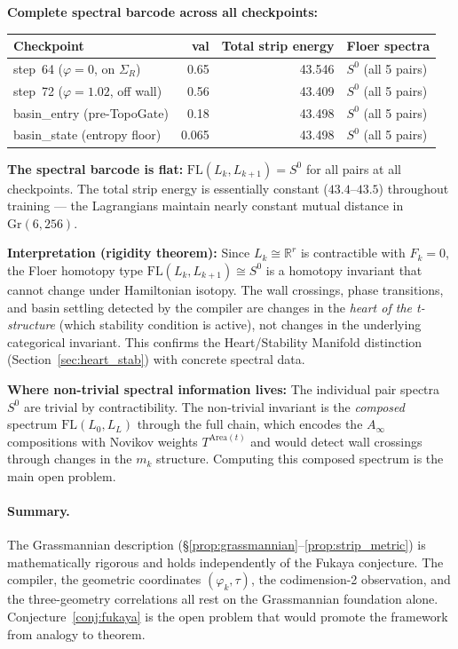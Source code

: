 \documentclass[11pt]{amsart}
\begin{document}
\textbf{Complete spectral barcode across all checkpoints:}

\begin{center}\small
\begin{tabular}{@{}lrrl@{}}
\toprule
Checkpoint & val & Total strip energy & Floer spectra \\
\midrule
step~64 ($\varphi=0$, on $\Sigma_R$) & 0.65 & 43.546 & $S^0$ (all 5 pairs) \\
step~72 ($\varphi=1.02$, off wall)   & 0.56 & 43.409 & $S^0$ (all 5 pairs) \\
basin\_entry (pre-TopoGate)          & 0.18 & 43.498 & $S^0$ (all 5 pairs) \\
basin\_state (entropy floor)         & 0.065 & 43.498 & $S^0$ (all 5 pairs) \\
\bottomrule
\end{tabular}
\end{center}

\textbf{The spectral barcode is flat:}
$\mathrm{FL}(L_k, L_{k+1}) = S^0$ for all pairs at all checkpoints.
The total strip energy is essentially constant ($43.4$--$43.5$) throughout
training --- the Lagrangians maintain nearly constant mutual distance
in $\mathrm{Gr}(6,256)$.

\textbf{Interpretation (rigidity theorem):}
Since $L_k \cong \mathbb{R}^r$ is contractible with $F_k = 0$,
the Floer homotopy type $\mathrm{FL}(L_k, L_{k+1}) \cong S^0$
is a homotopy invariant that cannot change under Hamiltonian isotopy.
The wall crossings, phase transitions, and basin settling detected by
the compiler are changes in the \emph{heart of the t-structure}
(which stability condition is active), not changes in the underlying
categorical invariant.
This confirms the Heart/Stability Manifold distinction
(Section~\ref{sec:heart_stab}) with concrete spectral data.

\textbf{Where non-trivial spectral information lives:}
The individual pair spectra $S^0$ are trivial by contractibility.
The non-trivial invariant is the \emph{composed} spectrum
$\mathrm{FL}(L_0, L_L)$ through the full chain,
which encodes the $A_\infty$ compositions with Novikov weights
$T^{\mathrm{Area}(t)}$ and would detect wall crossings through
changes in the $m_k$ structure.
Computing this composed spectrum is the main open problem.

\paragraph{Summary.}
The Grassmannian description (§\ref{prop:grassmannian}--\ref{prop:strip_metric})
is mathematically rigorous and holds independently of the Fukaya conjecture.
The compiler, the geometric coordinates $(\varphi_k, \tau)$, the
codimension-2 observation, and the three-geometry correlations all rest
on the Grassmannian foundation alone.
Conjecture~\ref{conj:fukaya} is the open problem that would promote
the framework from analogy to theorem.
\end{document}
